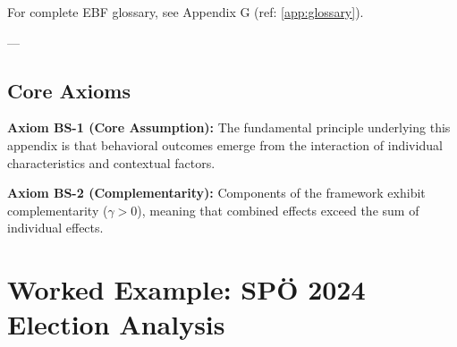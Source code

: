 For complete EBF glossary, see Appendix G (ref: \ref{app:glossary}).

---


\subsection{Core Axioms}
\label{sec:bs-axioms}

\begin{tcolorbox}[colback=yellow!5!white,colframe=yellow!75!black,title=Axiom BS-1: Fundamental Principle]
\textbf{Axiom BS-1 (Core Assumption):}
The fundamental principle underlying this appendix is that behavioral outcomes
emerge from the interaction of individual characteristics and contextual factors.
\end{tcolorbox}

\begin{tcolorbox}[colback=yellow!5!white,colframe=yellow!75!black,title=Axiom BS-2: Complementarity]
\textbf{Axiom BS-2 (Complementarity):}
Components of the framework exhibit complementarity ($\gamma > 0$), meaning
that combined effects exceed the sum of individual effects.
\end{tcolorbox}



\section{Worked Example: SPÖ 2024 Election Analysis}
\label{sec:bs-worked-example}

